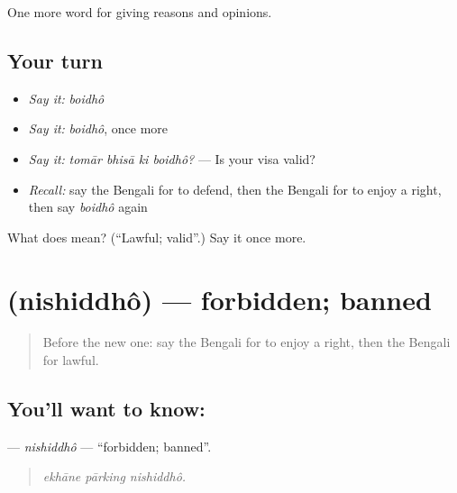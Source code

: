 \begin{grammarlens}[title={What you've built}]
One more word for giving reasons and opinions.
\end{grammarlens}

\subsection*{Your turn}
\begin{itemize}
\raggedright
  \item \emph{Say it:} \emph{boidhô}
  \item \emph{Say it:} \emph{boidhô}, once more
  \item \emph{Say it:} \emph{tomār bhisā ki boidhô?} — Is your visa valid?
  \item \emph{Recall:} say the Bengali for to defend, then the Bengali for to enjoy a right, then say \emph{boidhô} again
\end{itemize}

\begin{tcolorbox}[breakable,colback=teal!4,colframe=teal!35!black,title={Before you move on}]
What does  mean? (\textquotedblleft{}Lawful; valid\textquotedblright{}.) Say it once more.
\end{tcolorbox}
\section[\texorpdfstring{\bn{নিষিদ্ধ} (nishiddhô)}{নিষিদ্ধ (nishiddhô)}]{ (nishiddhô) — forbidden; banned}

\label{lesson:BN-C340-nishiddho}



\begin{quote}
Before the new one: say the Bengali for to enjoy a right, then the Bengali for lawful.
\end{quote}

\subsection*{You'll want to know: }
\textbf{} — \emph{nishiddhô} — \textquotedblleft{}forbidden; banned\textquotedblright{}.

\begin{quote}
  
\end{quote}

\begin{quote}
\emph{ekhāne pārking nishiddhô.}
\end{quote}

